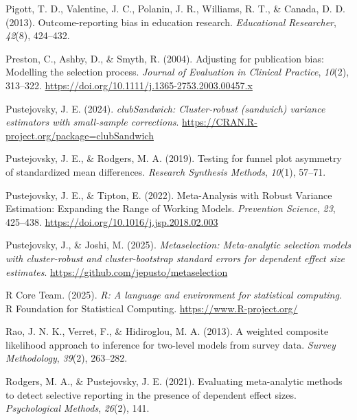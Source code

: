 \documentclass[
  man, donotrepeattitle,floatsintext]{apa7}
\newlength{\cslhangindent}
\newenvironment{CSLReferences}[2] %
 {\begin{list}{}{%
  \setlength{\itemindent}{0pt}
  \setlength{\leftmargin}{0pt}
  \setlength{\parsep}{0pt}
  \ifodd #1
   \setlength{\leftmargin}{\cslhangindent}
   \setlength{\itemindent}{-1\cslhangindent}
  \fi
  \setlength{\itemsep}{#2\baselineskip}}}
 {\end{list}}
\begin{document}
\begin{CSLReferences}{1}{0}
Pigott, T. D., Valentine, J. C., Polanin, J. R., Williams, R. T., \& Canada, D. D. (2013). Outcome-reporting bias in education research. \emph{Educational Researcher}, \emph{42}(8), 424--432.

Preston, C., Ashby, D., \& Smyth, R. (2004). Adjusting for publication bias: Modelling the selection process. \emph{Journal of Evaluation in Clinical Practice}, \emph{10}(2), 313--322. \url{https://doi.org/10.1111/j.1365-2753.2003.00457.x}

Pustejovsky, J. E. (2024). \emph{clubSandwich: Cluster-robust (sandwich) variance estimators with small-sample corrections}. \url{https://CRAN.R-project.org/package=clubSandwich}

Pustejovsky, J. E., \& Rodgers, M. A. (2019). Testing for funnel plot asymmetry of standardized mean differences. \emph{Research Synthesis Methods}, \emph{10}(1), 57--71.

Pustejovsky, J. E., \& Tipton, E. (2022). Meta-Analysis with Robust Variance Estimation: {Expanding} the Range of Working Models. \emph{Prevention Science}, \emph{23}, 425--438. \url{https://doi.org/10.1016/j.jsp.2018.02.003}

Pustejovsky, J., \& Joshi, M. (2025). \emph{Metaselection: Meta-analytic selection models with cluster-robust and cluster-bootstrap standard errors for dependent effect size estimates}. \url{https://github.com/jepusto/metaselection}

R Core Team. (2025). \emph{R: A language and environment for statistical computing}. R Foundation for Statistical Computing. \url{https://www.R-project.org/}

Rao, J. N. K., Verret, F., \& Hidiroglou, M. A. (2013). A weighted composite likelihood approach to inference for two-level models from survey data. \emph{Survey Methodology}, \emph{39}(2), 263--282.

Rodgers, M. A., \& Pustejovsky, J. E. (2021). Evaluating meta-analytic methods to detect selective reporting in the presence of dependent effect sizes. \emph{Psychological Methods}, \emph{26}(2), 141.


\end{CSLReferences}
\end{document}
